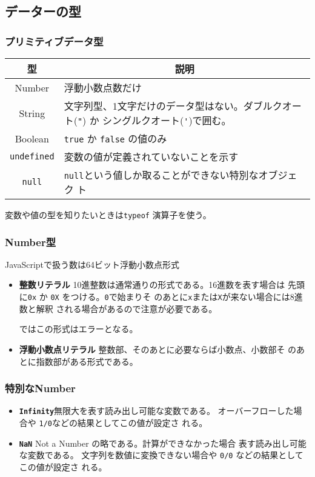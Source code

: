 \subsection{データーの型}
\begin{frame}[containsverbatim]
 \frametitle{プリミティブデータ型}
\begin{tabular}{|c|m{}|}\hline
 型&\multicolumn{1}{c|}{説明} \\\hline
 Number & 浮動小数点数だけ\\ \hline
 String & 文字列型、1文字だけのデータ型はない。ダブルクオート(\Verb+"+)
     か%
     シングルクオート(\Verb+'+)で囲む。\\ \hline
 Boolean& \Verb+true+ か \Verb+false+ の値のみ\\ \hline
 \Verb+undefined+ & 変数の値が定義されていないことを示す\\ \hline
 \Verb+null+& \Verb+null+という値しか取ることができない特別なオブジェク
     ト\\ \hline
\end{tabular}

変数や値の型を知りたいときは\Verb+typeof+ 演算子を使う。
\end{frame}
\begin{frame}[containsverbatim]
 \frametitle{Number型}
JavaScriptで扱う数は64ビット浮動小数点形式
\begin{itemize}
 \item{\bfseries 整数リテラル} 10進整数は通常通りの形式である。16進数を表す場合は
	      先頭に\Verb+0x+ か \Verb+0X+ をつける。\Verb+0+で始まりそ
	      のあとに\Verb+x+または\Verb+X+が来ない場合には8進数と解釈
      される場合があるので注意が必要である。

      \Strict ではこの形式はエラーとなる。
 \item{\bfseries 浮動小数点リテラル} 整数部、そのあとに必要ならば小数点、小数部そ
       のあとに指数部がある形式である。
\end{itemize}
\end{frame}
\begin{frame}[containsverbatim]
 \frametitle{特別なNumber}
\begin{itemize}
 \item {\bfseries \Verb+Infinity+}無限大を表す読み出し可能な変数である。
       オーバーフローした場合や \Verb+1/0+などの結果としてこの値が設定さ
       れる。
 \item {\bfseries \Verb+NaN+} Not a Number の略である。計算ができなかった場合
       表す読み出し可能な変数である。
       文字列を数値に変換できない場合や \Verb+0/0+ などの結果としてこの値が設定さ
       れる。
\end{itemize}
\end{frame}
